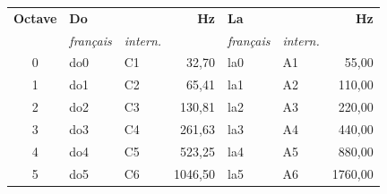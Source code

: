 
\begin{tabular}{@{}c l l r l l r@{}}
\toprule
\textbf{Octave} & \multicolumn{2}{l}{\textbf{Do}} & \textbf{Hz} & \multicolumn{2}{l}{\textbf{La}} & \textbf{Hz} \\
 & \textit{français} & \textit{intern.} & & \textit{français} & \textit{intern.} & \\
\midrule
0 & do0 & C1 & 32{,}70 & la0 & A1 & 55{,}00 \\
1 & do1 & C2 & 65{,}41 & la1 & A2 & 110{,}00 \\
2 & do2 & C3 & 130{,}81 & la2 & A3 & 220{,}00 \\
3 & do3 & C4 & 261{,}63 & la3 & A4 & 440{,}00 \\
4 & do4 & C5 & 523{,}25 & la4 & A5 & 880{,}00 \\
5 & do5 & C6 & 1046{,}50 & la5 & A6 & 1760{,}00 \\
\bottomrule
\end{tabular}
